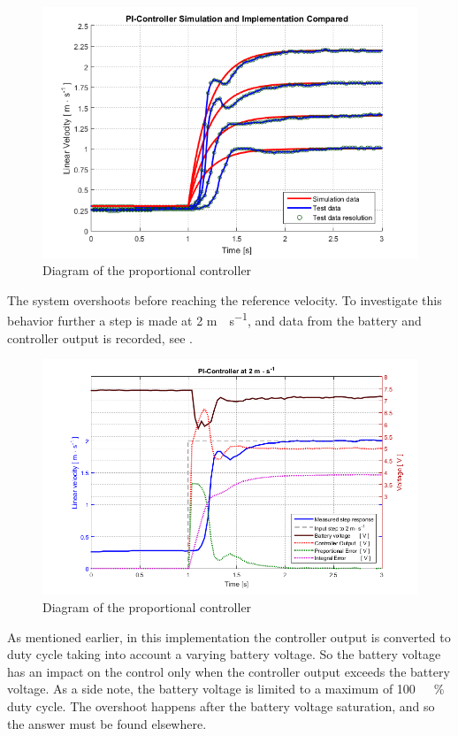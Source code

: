 \begin{figure}[H]
 	\centering
 	\includegraphics[width=.9\textwidth]{figures/multiStepPI}
 	\caption{Diagram of the proportional controller}
 	\label{fig:multiStepPI}
\end{figure}
%
The system overshoots before reaching the reference velocity. To investigate this behavior further a step is made at 2 \si{m\cdot s^{-1}}, and data from the battery and controller output is recorded, see .
%
\begin{figure}[H]
 	\centering
 	\includegraphics[width=.8\textwidth]{figures/PInoAntiWindup}
 	\caption{Diagram of the proportional controller}
 	\label{fig:PInoAntiWindup}
\end{figure}
%
As mentioned earlier, in this implementation the controller output is converted to duty cycle taking into account a varying battery voltage. So the battery voltage has an impact on the control only when the controller output exceeds the battery voltage. As a side note, the battery voltage is limited to a maximum of \si{100 \ \%} duty cycle.
The overshoot happens after the battery voltage saturation, and so the answer must be found elsewhere.

